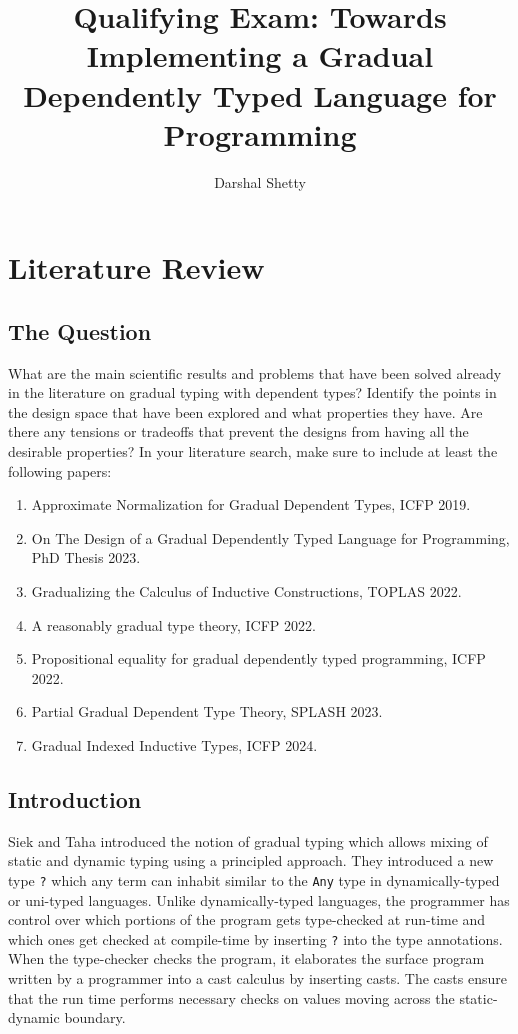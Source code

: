 \documentclass{article}
\title{Qualifying Exam: Towards Implementing a Gradual Dependently Typed
  Language for Programming}
\author{Darshal Shetty}
\date{}
\theoremstyle{definition}
\begin{document}
\maketitle

\section{Literature Review}%
\label{sec:question1}

\subsection{The Question}
What are the main scientific results and problems that have been solved already
in the literature on gradual typing with dependent types? Identify the points in
the design space that have been explored and what properties they have. Are
there any tensions or tradeoffs that prevent the designs from having all the
desirable properties? In your literature search, make sure to include at least
the following papers:

\begin{enumerate}
  \item Approximate Normalization for Gradual Dependent Types, ICFP
    2019.\cite{eremondi_approximate_2019}
  \item On The Design of a Gradual Dependently Typed Language for Programming,
    PhD Thesis 2023.\cite{eremondi_design_2023}
  \item Gradualizing the Calculus of Inductive Constructions, TOPLAS
    2022.\cite{lennon-bertrand_gradualizing_2022}
  \item A reasonably gradual type theory, ICFP
    2022.\cite{maillard_reasonably_2022}
  \item Propositional equality for gradual dependently typed programming, ICFP
    2022.\cite{eremondi_propositional_2022}
  \item Partial Gradual Dependent Type Theory, SPLASH
    2023.\cite{shi_partial_2023}
  \item Gradual Indexed Inductive Types, ICFP 2024.\cite{malewski_gradual_2024}
\end{enumerate}

\subsection{Introduction}

Siek and Taha\cite{siek_gradual_2006} introduced the notion of gradual typing
which allows mixing of static and dynamic typing using a principled approach.
They introduced a new type \verb|?| which any term can inhabit similar to the
\verb|Any| type in dynamically-typed or uni-typed languages. Unlike
dynamically-typed languages, the programmer has control over which portions of
the program gets type-checked at run-time and which ones get checked at
compile-time by inserting \verb|?| into the type annotations. When the
type-checker checks the program, it elaborates the surface program written by a
programmer into a cast calculus by inserting casts. The casts ensure that the
run time performs necessary checks on values moving across the static-dynamic
boundary.
\end{document}
